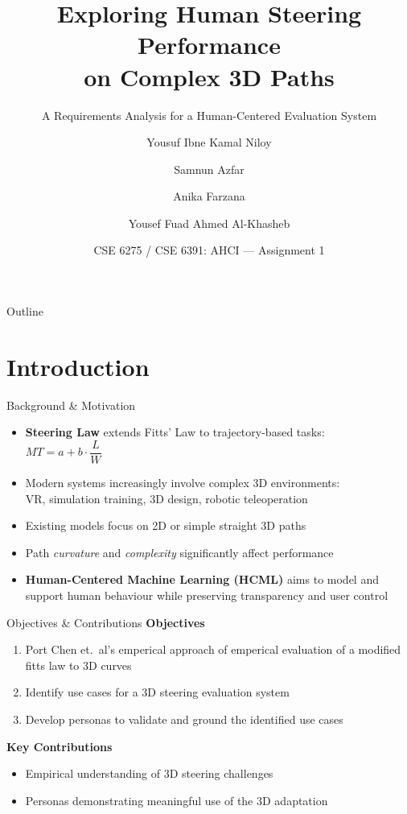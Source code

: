 \documentclass[aspectratio=169, 10pt]{beamer}
\title{Exploring Human Steering Performance\\on Complex 3D Paths}
\subtitle{A Requirements Analysis for a Human-Centered Evaluation System}
\author{
  Yousuf Ibne Kamal Niloy \and
  Samnun Azfar \and
  Anika Farzana \and
  Yousef Fuad Ahmed Al-Khasheb
}
\institute{
  Department of Computer Science and Engineering\\
  Islamic University of Technology (IUT), OIC
}
\date{CSE 6275 / CSE 6391: AHCI --- Assignment 1}
\begin{document}
\begin{frame}[plain]
  \maketitle
\end{frame}

\begin{frame}{Outline}
  \tableofcontents
\end{frame}

\section{Introduction}

\begin{frame}{Background \& Motivation}
  \begin{itemize}
    \item \textbf{Steering Law} extends Fitts' Law to trajectory-based tasks:\\
          $MT = a + b \cdot \dfrac{L}{W}$
    \item Modern systems increasingly involve \alert{complex 3D environments}:\\
          VR, simulation training, 3D design, robotic teleoperation
    \item Existing models focus on 2D or simple straight 3D paths
    \item Path \emph{curvature} and \emph{complexity} significantly affect performance
    \item \textbf{Human-Centered Machine Learning (HCML)} aims to model and support
          human behaviour while preserving transparency and user control
  \end{itemize}
\end{frame}

\begin{frame}{Objectives \& Contributions}
  \textbf{Objectives}
  \begin{enumerate}
    \item Port Chen et.\ al's emperical approach of emperical evaluation of a modified fitts law to 3D curves\cite{chen2025curves}
    \item Identify use cases for a 3D steering evaluation system
    \item Develop personas to validate and ground the identified use cases
  \end{enumerate}

  \vspace{0.5em}
  \textbf{Key Contributions}
  \begin{itemize}
    \item Empirical understanding of 3D steering challenges
    \item Personas demonstrating meaningful use of the 3D adaptation
  \end{itemize}
\end{frame}
\end{document}
